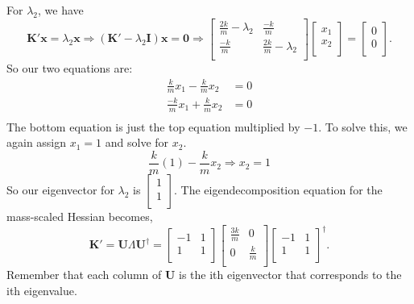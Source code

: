 \documentclass{article}
\newcommand{\be}{\begin{equation}}
\newcommand{\ee}{\end{equation}}
\newcommand{\bk}{\textbf{K}}
\begin{document}
For $\lambda_2$, we have
\be
  \bk' \textbf{x} = \lambda_2 \textbf{x} \Longrightarrow (\bk' - \lambda_2 \textbf{I}) \textbf{x} = \textbf{0} \Longrightarrow
  \begin{bmatrix}
    \frac{2k}{m} - \lambda_2 & \frac{-k}{m} \\
    \frac{-k}{m} & \frac{2k}{m} - \lambda_2 \\
  \end{bmatrix}
  \begin{bmatrix}
    x_1 \\
    x_2 \\
  \end{bmatrix}
  =
  \begin{bmatrix}
    0 \\
    0 \\
  \end{bmatrix} .
\ee
So our two equations are:
\be
  \begin{split}
    \frac{k}{m}x_1 - \frac{k}{m}x_2 &= 0 \\
    \frac{-k}{m}x_1 + \frac{k}{m}x_2 &= 0 \\
  \end{split}
\ee
The bottom equation is just the top equation multiplied by $-1$. To solve this, we again assign $x_1 = 1$ and solve for $x_2$.
\be
  \frac{k}{m}(1) - \frac{k}{m}x_2 \Longrightarrow x_2 = 1
\ee
So our eigenvector for $\lambda_2$ is $\begin{bmatrix} 1 \\ 1 \\ \end{bmatrix}$. The eigendecomposition equation for the mass-scaled Hessian becomes,
\be
  \bk' = \textbf{U} \Lambda \textbf{U}^{\dagger} =
  \begin{bmatrix}
    -1 & 1 \\
    1 & 1 \\
  \end{bmatrix}
  \begin{bmatrix}
    \frac{3k}{m} & 0 \\
    0 & \frac{k}{m} \\
  \end{bmatrix}
  \begin{bmatrix}
    -1 & 1 \\
    1 & 1 \\
  \end{bmatrix}^{\dagger} .
\ee
Remember that each column of \textbf{U} is the ith eigenvector that corresponds to the ith eigenvalue.
\end{document}
